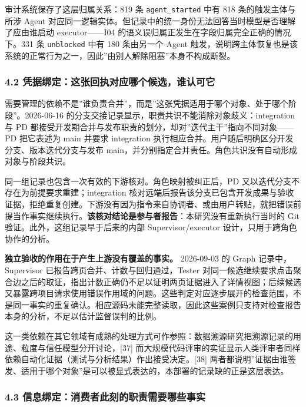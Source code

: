 \documentclass[
]{article}
\begin{document}
审计系统保存了这层归属关系：819 条 \texttt{agent\_started} 中有 818
条的触发主体与所涉 Agent
对应同一逻辑实体。但记录中的统一身份无法回答当时模型是否理解了应由谁启动
executor------I04 的语义误归属正发生在字段归属完全正确的情况下。331 条
\texttt{unblocked} 中有 180 条由另一个 Agent
触发，说明跨主体恢复也是该系统的正常行为之一，因此''由别人解除阻塞''本身不构成断裂。

\subsubsection{4.2
凭据绑定：这张回执对应哪个候选，谁认可它}\label{ux51edux636eux7ed1ux5b9aux8fd9ux5f20ux56deux6267ux5bf9ux5e94ux54eaux4e2aux5019ux9009ux8c01ux8ba4ux53efux5b83}

需要管理的依赖不是''谁负责合并''，而是''这张凭据适用于哪个对象、处于哪个阶段''。2026-06-16
的分支交接记录显示，职责共识不能消除对象歧义：integration 与 PD
都接受开发期合并与发布职责的划分，却对''迭代主干''指向不同对象------PD
把它表述为 main 并要求 integration
执行相应合并。用户随后明确区分开发分支、版本迭代分支与发布
main，并分别指定合并责任。角色共识没有自动形成对象与阶段共识。

同一组记录也包含一次有效的下游核对。角色映射被纠正后，PD
又以迭代分支不存在为前提要求重建；integration
核对远端后报告该分支已包含开发成果与验收证据，拒绝重复创建。下游没有因为指令来自协调者、或由用户转贴，就把错误前提当作事实继续执行。\textbf{该核对结论是参与者报告}：本研究没有重新执行当时的
Git 验证。此外，这组记录早于后来的内部 Supervisor/executor
设计，只用于跨角色协作的分析。

\textbf{独立验收的作用在于产生上游没有覆盖的事实。} 2026-09-03 的 Graph
记录中，Supervisor 已报告跨页合并、计数与回归通过，Tester
对同一候选继续要求点击聚合边之后的取证，指出计数正确仍不足以证明两页证据进入了详情视图；后续候选又暴露跨项目请求使用错误作用域的问题。这些判定对应逐步展开的检查范围，不是同一事实的重复确认。相应源码未能完整读取，因此这些案例只支持对检查报告本身的分析，不足以估计监督误判的比例。

这一类依赖在其它领域有成熟的处理方式可作参照：数据溯源研究把溯源记录的用途、粒度与信任模型分开讨论，{[}37{]}
而大规模代码评审的实证显示人类评审者同样依赖自动化证据（测试与分析结果）作出接受决定。{[}38{]}
两者都说明''证据由谁签发、适用于哪个对象''是可以被显式表达的，本部署的记录缺的正是这层表达。

\subsubsection{4.3
信息绑定：消费者此刻的职责需要哪些事实}\label{ux4fe1ux606fux7ed1ux5b9aux6d88ux8d39ux8005ux6b64ux523bux7684ux804cux8d23ux9700ux8981ux54eaux4e9bux4e8bux5b9e}
\end{document}
